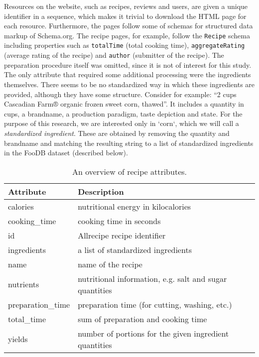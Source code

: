 Resources on the website, such as recipes, reviews and users, are given a unique identifier in a sequence, which makes it trivial to download the HTML page for each resource.
Furthermore, the pages follow some of schemas for structured data markup of Schema.org.
The recipe pages, for example, follow the \texttt{Recipe} schema including properties such as \texttt{totalTime} (total cooking time), \texttt{aggregateRating} (average rating of the recipe) and \texttt{author} (submitter of the recipe).
The preparation procedure itself was omitted, since it is not of interest for this study.
The only attribute that required some additional processing were the ingredients themselves.
There seems to be no standardized way in which these ingredients are provided, although they have some structure.
Consider for example: ``2 cups Cascadian Farm® organic frozen sweet corn, thawed''.
It includes a quantity in cups, a brandname, a production paradigm, taste depiction and state.
For the purpose of this research, we are interested only in `corn`, which we will call a \emph{standardized ingredient}.
These are obtained by removing the quantity and brandname and matching the resulting string to a list of standardized ingredients in the FooDB dataset (described below).

\begin{table}
	\caption{An overview of recipe attributes.}
	\label{tab:recipe_attributes}
	
	\centering
	\begin{tabular}{l l}
		\toprule
		\textbf{Attribute} & \textbf{Description} \\
		\midrule
		calories & nutritional energy in kilocalories \\
 		cooking\_time & cooking time in seconds \\
 		id & Allrecipe recipe identifier \\
 		ingredients & a list of standardized ingredients \\
 		name & name of the recipe \\
 		nutrients & nutritional information, e.g. salt and sugar quantities \\
 		preparation\_time & preparation time (for cutting, washing, etc.) \\
 		total\_time & sum of preparation and cooking time \\
 		yields & number of portions for the given ingredient quantities \\
 	\bottomrule
	\end{tabular}
\end{table}

